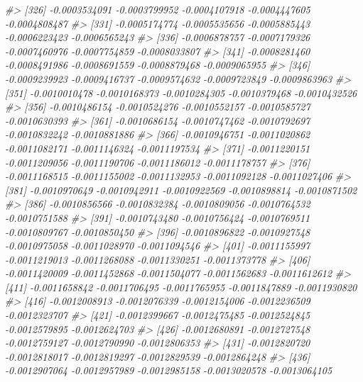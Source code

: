 \documentclass[
]{article}
\newenvironment{Shaded}{\begin{snugshade}}{\end{snugshade}}
\newcommand{\CommentTok}[1]{\textcolor[rgb]{0.56,0.35,0.01}{\textit{#1}}}
\begin{document}
\begin{Shaded}
\begin{Highlighting}[]
\CommentTok{\#\textgreater{} [326] {-}0.0003534091 {-}0.0003799952 {-}0.0004107918 {-}0.0004447605 {-}0.0004808487}
\CommentTok{\#\textgreater{} [331] {-}0.0005174774 {-}0.0005535656 {-}0.0005885443 {-}0.0006223423 {-}0.0006565243}
\CommentTok{\#\textgreater{} [336] {-}0.0006878757 {-}0.0007179326 {-}0.0007460976 {-}0.0007754859 {-}0.0008033807}
\CommentTok{\#\textgreater{} [341] {-}0.0008281460 {-}0.0008491986 {-}0.0008691559 {-}0.0008879468 {-}0.0009065955}
\CommentTok{\#\textgreater{} [346] {-}0.0009239923 {-}0.0009416737 {-}0.0009574632 {-}0.0009723849 {-}0.0009863963}
\CommentTok{\#\textgreater{} [351] {-}0.0010010478 {-}0.0010168373 {-}0.0010284305 {-}0.0010379468 {-}0.0010432526}
\CommentTok{\#\textgreater{} [356] {-}0.0010486154 {-}0.0010524276 {-}0.0010552157 {-}0.0010585727 {-}0.0010630393}
\CommentTok{\#\textgreater{} [361] {-}0.0010686154 {-}0.0010747462 {-}0.0010792697 {-}0.0010832242 {-}0.0010881886}
\CommentTok{\#\textgreater{} [366] {-}0.0010946751 {-}0.0011020862 {-}0.0011082171 {-}0.0011146324 {-}0.0011197534}
\CommentTok{\#\textgreater{} [371] {-}0.0011220151 {-}0.0011209056 {-}0.0011190706 {-}0.0011186012 {-}0.0011178757}
\CommentTok{\#\textgreater{} [376] {-}0.0011168515 {-}0.0011155002 {-}0.0011132953 {-}0.0011092128 {-}0.0011027406}
\CommentTok{\#\textgreater{} [381] {-}0.0010970649 {-}0.0010942911 {-}0.0010922569 {-}0.0010898814 {-}0.0010871502}
\CommentTok{\#\textgreater{} [386] {-}0.0010856566 {-}0.0010832384 {-}0.0010809056 {-}0.0010764532 {-}0.0010751588}
\CommentTok{\#\textgreater{} [391] {-}0.0010743480 {-}0.0010756424 {-}0.0010769511 {-}0.0010809767 {-}0.0010850450}
\CommentTok{\#\textgreater{} [396] {-}0.0010896822 {-}0.0010927548 {-}0.0010975058 {-}0.0011028970 {-}0.0011094546}
\CommentTok{\#\textgreater{} [401] {-}0.0011155997 {-}0.0011219013 {-}0.0011268088 {-}0.0011330251 {-}0.0011373778}
\CommentTok{\#\textgreater{} [406] {-}0.0011420009 {-}0.0011452868 {-}0.0011504077 {-}0.0011562683 {-}0.0011612612}
\CommentTok{\#\textgreater{} [411] {-}0.0011658842 {-}0.0011706495 {-}0.0011765955 {-}0.0011847889 {-}0.0011930820}
\CommentTok{\#\textgreater{} [416] {-}0.0012008913 {-}0.0012076339 {-}0.0012154006 {-}0.0012236509 {-}0.0012323707}
\CommentTok{\#\textgreater{} [421] {-}0.0012399667 {-}0.0012475485 {-}0.0012524845 {-}0.0012579895 {-}0.0012624703}
\CommentTok{\#\textgreater{} [426] {-}0.0012680891 {-}0.0012727548 {-}0.0012759127 {-}0.0012790990 {-}0.0012806353}
\CommentTok{\#\textgreater{} [431] {-}0.0012820720 {-}0.0012818017 {-}0.0012819297 {-}0.0012829539 {-}0.0012864248}
\CommentTok{\#\textgreater{} [436] {-}0.0012907064 {-}0.0012957989 {-}0.0012985158 {-}0.0013020578 {-}0.0013064105}

\end{Highlighting}
\end{Shaded}
\end{document}
